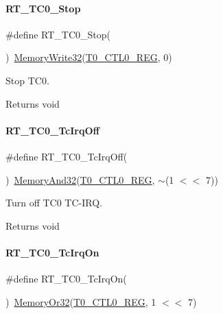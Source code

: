 \paragraph{\texorpdfstring{R\+T\+\_\+\+T\+C0\+\_\+\+Stop}{RT\_TC0\_Stop}}
{\footnotesize\ttfamily \#define R\+T\+\_\+\+T\+C0\+\_\+\+Stop(\begin{DoxyParamCaption}{ }\end{DoxyParamCaption})~\mbox{\hyperlink{a00020_a6b9732365b12e48ddb89fe1028b975b0}{Memory\+Write32}}(\mbox{\hyperlink{a00020_ac94b0659ef32086a6752672082c0b3ed}{T0\+\_\+\+C\+T\+L0\+\_\+\+R\+EG}}, 0)}



Stop T\+C0. 

\begin{DoxyReturn}{Returns}
void 
\end{DoxyReturn}
\mbox{\label{a00041_a7434ed75487de93c69569c05430967ae}} 
\paragraph{\texorpdfstring{R\+T\+\_\+\+T\+C0\+\_\+\+Tc\+Irq\+Off}{RT\_TC0\_TcIrqOff}}
{\footnotesize\ttfamily \#define R\+T\+\_\+\+T\+C0\+\_\+\+Tc\+Irq\+Off(\begin{DoxyParamCaption}{ }\end{DoxyParamCaption})~\mbox{\hyperlink{a00020_ad87cedffcaadc51db22594fce55173d4}{Memory\+And32}}(\mbox{\hyperlink{a00020_ac94b0659ef32086a6752672082c0b3ed}{T0\+\_\+\+C\+T\+L0\+\_\+\+R\+EG}}, $\sim$(1 $<$$<$ 7))}



Turn off T\+C0 T\+C-\/\+I\+RQ. 

\begin{DoxyReturn}{Returns}
void 
\end{DoxyReturn}
\mbox{\label{a00041_a1ff15e860147b3fff582b7603ba7ffa8}} 
\paragraph{\texorpdfstring{R\+T\+\_\+\+T\+C0\+\_\+\+Tc\+Irq\+On}{RT\_TC0\_TcIrqOn}}
{\footnotesize\ttfamily \#define R\+T\+\_\+\+T\+C0\+\_\+\+Tc\+Irq\+On(\begin{DoxyParamCaption}{ }\end{DoxyParamCaption})~\mbox{\hyperlink{a00020_a27874a97deab7cecdde5ddecf466e31e}{Memory\+Or32}}(\mbox{\hyperlink{a00020_ac94b0659ef32086a6752672082c0b3ed}{T0\+\_\+\+C\+T\+L0\+\_\+\+R\+EG}}, 1 $<$$<$ 7)}



